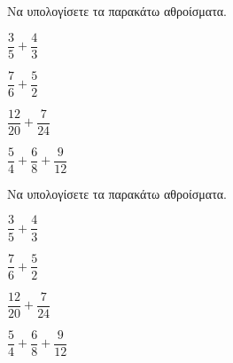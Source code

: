 Να υπολογίσετε τα παρακάτω αθροίσματα.
\begin{multicols}{2}
\begin{rlist}
\item $ \dfrac{3}{5}+\dfrac{4}{3} $
\item $ \dfrac{7}{6}+\dfrac{5}{2} $
\item $ \dfrac{12}{20}+\dfrac{7}{24} $
\item $ \dfrac{5}{4}+\dfrac{6}{8}+\dfrac{9}{12} $
\end{rlist}
\end{multicols}
Να υπολογίσετε τα παρακάτω αθροίσματα.
\begin{multicols}{2}
\begin{rlist}
\item $ \dfrac{3}{5}+\dfrac{4}{3} $
\item $ \dfrac{7}{6}+\dfrac{5}{2} $
\item $ \dfrac{12}{20}+\dfrac{7}{24} $
\item $ \dfrac{5}{4}+\dfrac{6}{8}+\dfrac{9}{12} $
\end{rlist}
\end{multicols}
